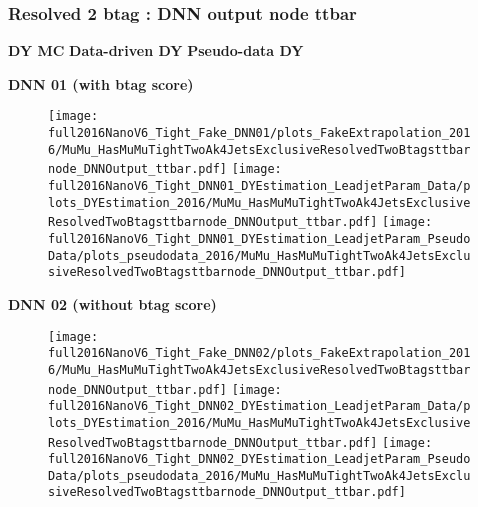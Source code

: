 \documentclass[9pt]{beamer}
\begin{document}
\begin{frame}
	\frametitle{Resolved 2 btag : DNN output node ttbar}
    \hspace{2cm} \textbf{DY MC} \hspace{1.9cm} \textbf{Data-driven DY} \hspace{1cm} \textbf{Pseudo-data DY}
    \begin{center}
        \textbf{DNN 01 (with btag score)}
    \end{center}
	\begin{figure}
		\texttt{[image: full2016NanoV6\_Tight\_Fake\_DNN01/plots\_FakeExtrapolation\_2016/MuMu\_HasMuMuTightTwoAk4JetsExclusiveResolvedTwoBtagsttbarnode\_DNNOutput\_ttbar.pdf]}
		\texttt{[image: full2016NanoV6\_Tight\_DNN01\_DYEstimation\_LeadjetParam\_Data/plots\_DYEstimation\_2016/MuMu\_HasMuMuTightTwoAk4JetsExclusiveResolvedTwoBtagsttbarnode\_DNNOutput\_ttbar.pdf]}
		\texttt{[image: full2016NanoV6\_Tight\_DNN01\_DYEstimation\_LeadjetParam\_PseudoData/plots\_pseudodata\_2016/MuMu\_HasMuMuTightTwoAk4JetsExclusiveResolvedTwoBtagsttbarnode\_DNNOutput\_ttbar.pdf]}
	\end{figure}
    \begin{center}
        \textbf{DNN 02 (without btag score)}
    \end{center}
	\begin{figure}
		\texttt{[image: full2016NanoV6\_Tight\_Fake\_DNN02/plots\_FakeExtrapolation\_2016/MuMu\_HasMuMuTightTwoAk4JetsExclusiveResolvedTwoBtagsttbarnode\_DNNOutput\_ttbar.pdf]}
		\texttt{[image: full2016NanoV6\_Tight\_DNN02\_DYEstimation\_LeadjetParam\_Data/plots\_DYEstimation\_2016/MuMu\_HasMuMuTightTwoAk4JetsExclusiveResolvedTwoBtagsttbarnode\_DNNOutput\_ttbar.pdf]}
		\texttt{[image: full2016NanoV6\_Tight\_DNN02\_DYEstimation\_LeadjetParam\_PseudoData/plots\_pseudodata\_2016/MuMu\_HasMuMuTightTwoAk4JetsExclusiveResolvedTwoBtagsttbarnode\_DNNOutput\_ttbar.pdf]}
	\end{figure}
\end{frame}
\end{document}
